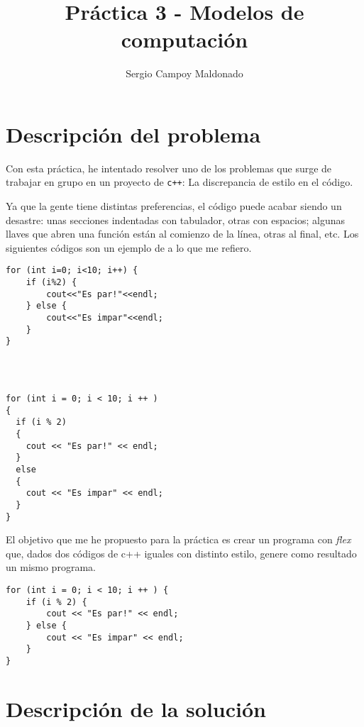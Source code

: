 \documentclass[10pt]{article}
\title{Práctica 3 - Modelos de computación}
\author{Sergio Campoy Maldonado}
\begin{document}
    

    \tableofcontents

    \pagebreak

    \section{Descripción del problema}

    Con esta práctica, he intentado resolver uno de los problemas que surge de trabajar en grupo en un proyecto de \texttt{c++}: La discrepancia de estilo en el código.
    
    Ya que la gente tiene distintas preferencias, el código puede acabar siendo un desastre: unas secciones indentadas con tabulador, otras con espacios; algunas llaves que abren una función están al comienzo de la línea, otras al final, etc. Los siguientes códigos son un ejemplo de a lo que me refiero.

    \begin{multicols}{2}
        \begin{lstlisting}
for (int i=0; i<10; i++) {
    if (i%2) {
        cout<<"Es par!"<<endl;
    } else {
        cout<<"Es impar"<<endl;
    }
}




        \end{lstlisting}
        \columnbreak
        \begin{lstlisting}
for (int i = 0; i < 10; i ++ )
{
  if (i % 2)
  {
    cout << "Es par!" << endl;
  }
  else
  {
    cout << "Es impar" << endl;
  }
}
        \end{lstlisting}
    \end{multicols}

    El objetivo que me he propuesto para la práctica es crear un programa con \emph{flex} que, dados dos códigos de c++ iguales con distinto estilo, genere como resultado un mismo programa.

    \begin{lstlisting}
for (int i = 0; i < 10; i ++ ) {
    if (i % 2) {
        cout << "Es par!" << endl;
    } else { 
        cout << "Es impar" << endl;
    }
}
    \end{lstlisting}

    \pagebreak

    \section{Descripción de la solución}
\end{document}
